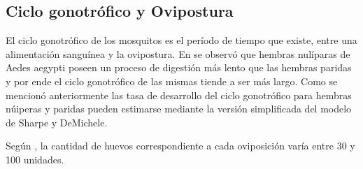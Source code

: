 \subsection{Ciclo gonotrófico y Ovipostura}
\label{subsec:cap4-ciclo-gontrofico-ovipostura}
El ciclo gonotrófico de los mosquitos es el período de tiempo que existe, entre una alimentación
sanguínea y la ovipostura. En \cite{edman1987host} se observó que hembras nulíparas de Aedes
aegypti poseen un proceso de digestión más lento que las hembras paridas y por ende el ciclo
gonotrófico de las mismas tiende a ser más largo. Como se mencionó anteriormente las tasa de
desarrollo del ciclo gonotrófico para hembras núiperas y paridas pueden estimarse mediante la
versión simplificada del modelo de Sharpe y DeMichele.

Según \cite{luevano1993ciclo, beltran2001bionomia, cabezas2005dengue}, la cantidad de huevos
correspondiente a cada oviposición varía entre 30 y 100 unidades.
